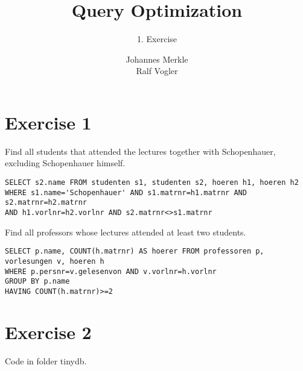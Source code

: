 \documentclass[11pt,a4paper]{scrartcl}
\begin{document}
\author{Johannes Merkle\\Ralf Vogler}
\title{Query Optimization}
\subtitle{1. Exercise}

\maketitle

\section*{Exercise 1}
Find all students that attended the lectures together with Schopenhauer, excluding
Schopenhauer himself.
\begin{verbatim}
SELECT s2.name FROM studenten s1, studenten s2, hoeren h1, hoeren h2
WHERE s1.name='Schopenhauer' AND s1.matrnr=h1.matrnr AND s2.matrnr=h2.matrnr
AND h1.vorlnr=h2.vorlnr AND s2.matrnr<>s1.matrnr
\end{verbatim}
\vspace*{5pt}
Find all professors whose lectures attended at least two students.
\begin{verbatim}
SELECT p.name, COUNT(h.matrnr) AS hoerer FROM professoren p, vorlesungen v, hoeren h
WHERE p.persnr=v.gelesenvon AND v.vorlnr=h.vorlnr
GROUP BY p.name
HAVING COUNT(h.matrnr)>=2
\end{verbatim}


\section*{Exercise 2}
Code in folder tinydb.
\end{document}
